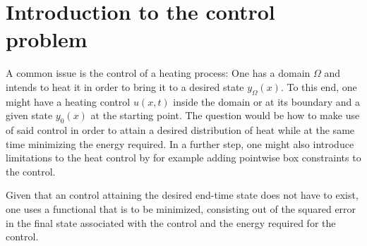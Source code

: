 \documentclass[../thesis.tex]{subfiles}
\begin{document}
\chapter{Introduction to the control problem}
\label{sec:OptimalControlProblem}
A common issue is the control of a heating process: One has a domain $\Omega$ and intends to heat it in order to bring it to a desired state $y_\Omega (x)$.
To this end, one might have a heating control $u(x, t)$ inside the domain or at its boundary and a given state $y_0 (x)$ at the starting point.
The question would be how to make use of said control in order to attain a desired distribution of heat while at the same time minimizing the energy required.
In a further step, one might also introduce limitations to the heat control by for example adding pointwise box constraints to the control.

Given that an control attaining the desired end-time state does not have to exist, one uses a functional that is to be minimized, consisting out of the squared error in the final state associated with the control and the energy required for the control.
\end{document}
